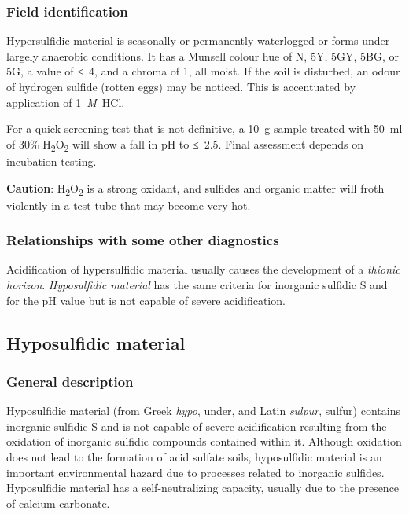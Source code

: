 \documentclass[
  letterpaper,
  DIV=11,
  numbers=noendperiod]{scrreprt}
\begin{document}
\hypertarget{field-identification-43}{%
\subsubsection{Field identification}\label{field-identification-43}}

Hypersulfidic material is seasonally or permanently waterlogged or forms
under largely anaerobic conditions. It has a Munsell colour hue of N,
5Y, 5GY, 5BG, or 5G, a value of ≤~4, and a chroma of 1, all moist. If
the soil is disturbed, an odour of hydrogen sulfide (rotten eggs) may be
noticed. This is accentuated by application of 1~\emph{M}~HCl.

For a quick screening test that is not definitive, a 10~g sample treated
with 50~ml of 30\% H\textsubscript{2}O\textsubscript{2} will show a fall
in pH to ≤~2.5. Final assessment depends on incubation testing.

\textbf{Caution}: H\textsubscript{2}O\textsubscript{2} is a strong
oxidant, and sulfides and organic matter will froth violently in a test
tube that may become very hot.

\hypertarget{relationships-with-some-other-diagnostics-57}{%
\subsubsection{Relationships with some other
diagnostics}\label{relationships-with-some-other-diagnostics-57}}

Acidification of hypersulfidic material usually causes the development
of a \emph{thionic horizon}. \emph{Hyposulfidic material} has the same
criteria for inorganic sulfidic S and for the pH value but is not
capable of severe acidification.

\hypertarget{hyposulfidic-material}{%
\subsection{Hyposulfidic material}\label{hyposulfidic-material}}

\hypertarget{general-description-61}{%
\subsubsection{General description}\label{general-description-61}}

Hyposulfidic material (from Greek \emph{hypo}, under, and Latin
\emph{sulpur}, sulfur) contains inorganic sulfidic S and is not capable
of severe acidification resulting from the oxidation of inorganic
sulfidic compounds contained within it. Although oxidation does not lead
to the formation of acid sulfate soils, hyposulfidic material is an
important environmental hazard due to processes related to inorganic
sulfides. Hyposulfidic material has a self-neutralizing capacity,
usually due to the presence of calcium carbonate.
\end{document}
